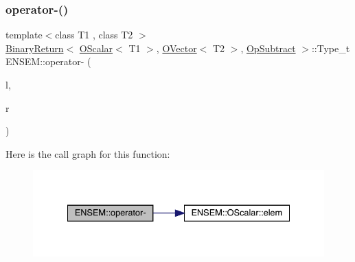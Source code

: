 \subsubsection{\texorpdfstring{operator-\/()}{operator-()}\hspace{0.1cm}{\footnotesize\ttfamily [4/4]}}
{\footnotesize\ttfamily template$<$class T1 , class T2 $>$ \\
\mbox{\hyperlink{structENSEM_1_1BinaryReturn}{Binary\+Return}}$<$ \mbox{\hyperlink{classENSEM_1_1OScalar}{O\+Scalar}}$<$ T1 $>$, \mbox{\hyperlink{classENSEM_1_1OVector}{O\+Vector}}$<$ T2 $>$, \mbox{\hyperlink{structENSEM_1_1OpSubtract}{Op\+Subtract}} $>$\+::Type\+\_\+t E\+N\+S\+E\+M\+::operator-\/ (\begin{DoxyParamCaption}\item[{const \mbox{\hyperlink{classENSEM_1_1OScalar}{O\+Scalar}}$<$ T1 $>$ \&}]{l,  }\item[{const \mbox{\hyperlink{classENSEM_1_1OVector}{O\+Vector}}$<$ T2 $>$ \&}]{r }\end{DoxyParamCaption})\hspace{0.3cm}{\ttfamily [inline]}}

Here is the call graph for this function\+:\nopagebreak
\begin{figure}[H]
\begin{center}
\leavevmode
\includegraphics[width=334pt]{da/d59/group__obsvector_gaa851105d0e0292f6a8503c61aafb6bb8_cgraph}
\end{center}
\end{figure}
\mbox{\label{group__obsvector_ga85053dcc452aa903b53e9b24dc0d5fb9}} 
